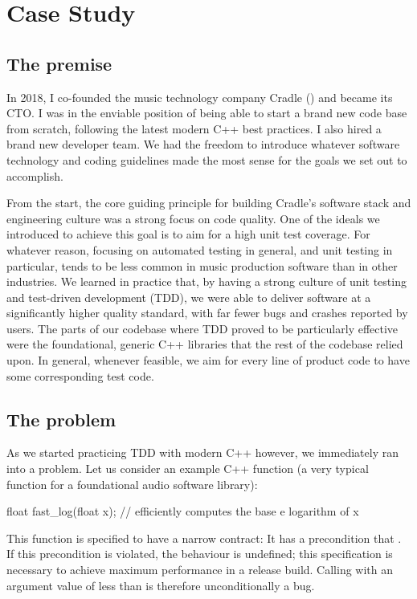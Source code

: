 \section{Case Study}
\label{sec:casestudy}

\subsection{The premise}

In 2018, I co-founded the music technology company Cradle (\hyperref[https://cradle.app]{}) and became its CTO. I was in the enviable position of being able to start a brand new code base from scratch, following the latest modern C++ best practices. I also hired a brand new developer team. We had the freedom to introduce whatever software technology and coding guidelines made the most sense for the goals we set out to accomplish.

From the start, the core guiding principle for building Cradle's software stack and engineering culture was a strong focus on code quality. One of the ideals we introduced to achieve this goal is to aim for a high unit test coverage. For whatever reason, focusing on automated testing in general, and unit testing in particular, tends to be less common in  music production software than in other industries. We learned in practice that, by having a strong culture of unit testing and test-driven development (TDD), we were able to deliver software at a significantly higher quality standard, with far fewer bugs and crashes reported by users. The parts of our codebase where TDD proved to be particularly effective were the foundational, generic C++ libraries that the rest of the codebase relied upon. In general, whenever feasible, we aim for every line of product code to have some corresponding test code.

\subsection{The problem}

As we started practicing TDD with modern C++ however, we immediately ran into a problem. Let us consider an example C++ function (a very typical function for a foundational audio software library):
\begin{codeblock}
float fast_log(float x);  // efficiently computes the base e logarithm of x
\end{codeblock}

This function is specified to have a narrow contract: It has a precondition that . If this precondition is violated, the behaviour is undefined; this specification is necessary to achieve maximum performance in a release build. Calling  with an argument value of less than  is therefore unconditionally a bug.

